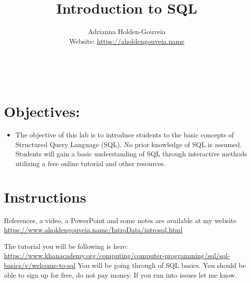 \documentclass[12pt]{article}
\title{Introduction to SQL}
\author{
        Adrianna Holden-Gouveia \\
        Website: \url{https://aholdengouveia.name}\\ 
        \date{\vspace{-5ex}}
        \faLinkedin{: aholdengouveia} \\
        \faGithub {: aholdengouveia} \\
        }
\begin{document}
    

\maketitle


\section*{Objectives:}
\begin{itemize}
    \item The objective of this lab is to introduce students to the basic concepts of Structured Query Language (SQL). No prior knowledge of SQL is assumed. Students will gain a basic understanding of SQL through interactive methods utilizing a free online tutorial and other resources.
\end{itemize}
\section*{Instructions}

References, a video, a PowerPoint and some notes are available at my website
\url {https://www.aholdengouveia.name/IntroData/introsql.html}

The tutorial you will be following is here: \url{https://www.khanacademy.org/computing/computer-programming/sql/sql-basics/v/welcome-to-sql} You will be going through of SQL basics.  You should be able to sign up for free, do not pay money. If you run into issues let me know.
\end{document}
